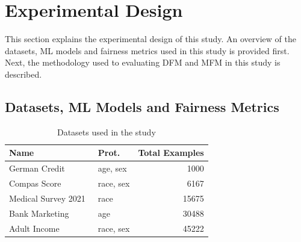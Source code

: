 \documentclass{article}
\begin{document}








\section{Experimental Design}\label{sec:method}
This section explains the experimental design of this study. An
overview of the datasets, ML models and fairness metrics used in this
study is provided first. Next, the methodology used to evaluating DFM and
MFM in this study is described.

\subsection{Datasets, ML Models and Fairness Metrics}\label{sec:method-parameters}

\begin{table}
  \centering
  \caption{Datasets used in the study}
  \begin{tabular}{l l r}
    \toprule
    \textbf{Name} & \textbf{Prot.} & \textbf{Total Examples}\\
    \midrule
    German Credit \cite{hofmann1994german} & age, sex & 1000\\
    Compas Score \cite{angwin2016machine} & race, sex & 6167\\
    Medical Survey 2021 \cite{mepsdata} & race & 15675\\
    Bank Marketing \cite{moro2014data} & age & 30488\\
    Adult Income \cite{kohavi1996scaling} & race, sex & 45222\\
    \bottomrule
  \end{tabular}
  \label{tab:datasets}
\end{table}
\end{document}
